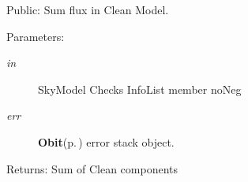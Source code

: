 Public: Sum flux in Clean Model. 

\begin{Desc}
\item[Parameters:]
\begin{description}
\item[{\em in}]Sky\-Model Checks Info\-List member no\-Neg \item[{\em err}]{\bf Obit}{\rm (p.\,\pageref{structObit})} error stack object. \end{description}
\end{Desc}
\begin{Desc}
\item[Returns:]Sum of Clean components \end{Desc}
